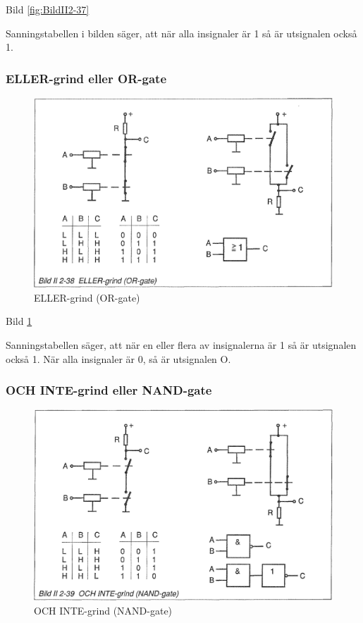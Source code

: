 Bild \ref{fig:BildII2-37}

Sanningstabellen i bilden säger, att när alla insignaler är 1 så är utsignalen
också 1.

\subsubsection{ELLER-grind eller OR-gate}

\begin{figure}[h]
\begin{center}
\includegraphics[width=14cm]{images/bild_2_2-38}
\caption{ELLER-grind (OR-gate)}
\label{fig:BildII2-38}
\end{center}
\end{figure}

Bild \ref{fig:BildII2-38}

Sanningstabellen säger, att när en eller flera av insignalerna är 1 så är
utsignalen också 1. När alla insignaler är 0, så är utsignalen O.

\subsubsection{OCH INTE-grind eller NAND-gate}

\begin{figure}[h]
\begin{center}
\includegraphics[width=14cm]{images/bild_2_2-39}
\caption{OCH INTE-grind (NAND-gate)}
\label{fig:BildII2-39}
\end{center}
\end{figure}

